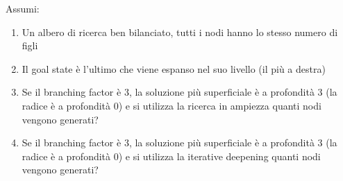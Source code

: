 \documentclass[a4paper]{article}
\begin{document}
\begin{exercise}
  Assumi:
  \begin{enumerate}
    \item Un albero di ricerca ben bilanciato, tutti i nodi hanno lo stesso numero di figli
    \item Il goal state è l'ultimo che viene espanso nel suo livello (il più a destra)
    \item Se il branching factor è 3, la soluzione più superficiale è a profondità 3
      (la radice è a profondità 0) e si utilizza la ricerca in ampiezza quanti nodi
      vengono generati?
    \item Se il branching factor è 3, la soluzione più superficiale è a profondità 3
      (la radice è a profondità 0) e si utilizza la iterative deepening quanti nodi
      vengono generati?
  \end{enumerate}
\end{exercise}
\end{document}
